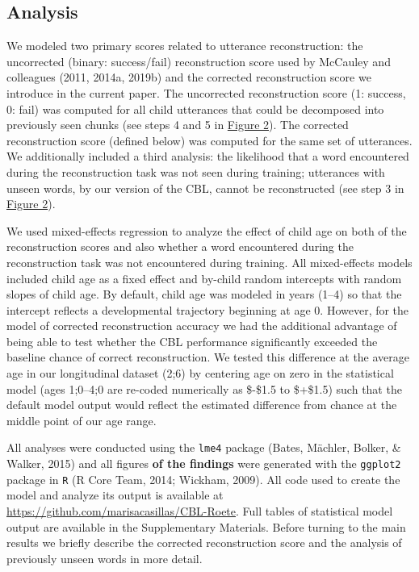 \documentclass[
  english,
  man,mask,floatsintext]{apa6}
\begin{document}
\hypertarget{analysis}{%
\subsection{Analysis}\label{analysis}}

We modeled two primary scores related to utterance reconstruction: the uncorrected (binary: success/fail) reconstruction score used by McCauley and colleagues (2011, 2014a, 2019b) and the corrected reconstruction score we introduce in the current paper. The uncorrected reconstruction score (1: success, 0: fail) was computed for all child utterances that could be decomposed into previously seen chunks (see steps 4 and 5 in \protect\hyperlink{fig2}{Figure 2}). The corrected reconstruction score (defined below) was computed for the same set of utterances. We additionally included a third analysis: the likelihood that a word encountered during the reconstruction task was not seen during training; utterances with unseen words, by our version of the CBL, cannot be reconstructed (see step 3 in \protect\hyperlink{fig2}{Figure 2}).

We used mixed-effects regression to analyze the effect of child age on both of the reconstruction scores and also whether a word encountered during the reconstruction task was not encountered during training. All mixed-effects models included child age as a fixed effect and by-child random intercepts with random slopes of child age. By default, child age was modeled in years (1--4) so that the intercept reflects a developmental trajectory beginning at age 0. However, for the model of corrected reconstruction accuracy we had the additional advantage of being able to test whether the CBL performance significantly exceeded the baseline chance of correct reconstruction. We tested this difference at the average age in our longitudinal dataset (2;6) by centering age on zero in the statistical model (ages 1;0--4;0 are re-coded numerically as \$-\$1.5 to \$+\$1.5) such that the default model output would reflect the estimated difference from chance at the middle point of our age range.

All analyses were conducted using the \texttt{lme4} package (Bates, Mächler, Bolker, \& Walker, 2015) and all figures \textbf{of the findings} were generated with the \texttt{ggplot2} package in \texttt{R} (R Core Team, 2014; Wickham, 2009). All code used to create the model and analyze its output is available at \href{}{https://github.com/marisacasillas/CBL-Roete}. Full tables of statistical model output are available in the Supplementary Materials. Before turning to the main results we briefly describe the corrected reconstruction score and the analysis of previously unseen words in more detail.
\end{document}
